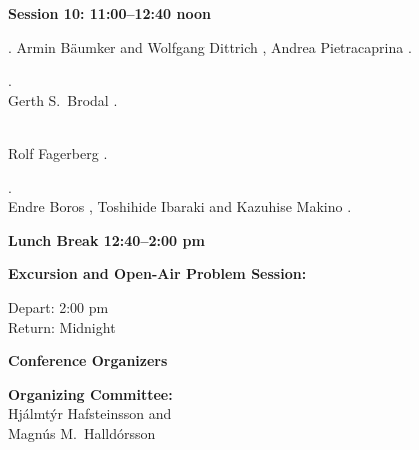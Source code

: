 {\bf Session 10:  11:00--12:40 noon}
\begin{session}
\item[11:00]
.
		{\who Armin B\"aumker and Wolfgang Dittrich} ,
		{\who Andrea Pietracaprina} .

\item[11:25]
. \\
		{\who Gerth S.\ Brodal} .

\item[11:50]
 \\
		{\who Rolf Fagerberg} .

\item[12:15]
. \\
		{\who Endre Boros} , 
		{\who Toshi\-hide Ibaraki and Kazu\-hise Makino} .
\end{session}

{\bf Lunch Break 12:40--2:00 pm}

\vskip 6pt

{\bf Excursion and Open-Air Problem Session: }

Depart:  2:00 pm \\
Return: Midnight

\newpage
\parskip=4pt
\begin{center}

{\normalsize\bf Conference Organizers}

\end{center}

\vspace{1cm}

{\bf Organizing Committee:} \\
{\who Hj\'almt\'yr Hafsteinsson and \\
Magn\'us M.\ Halld\'orsson}  \\


